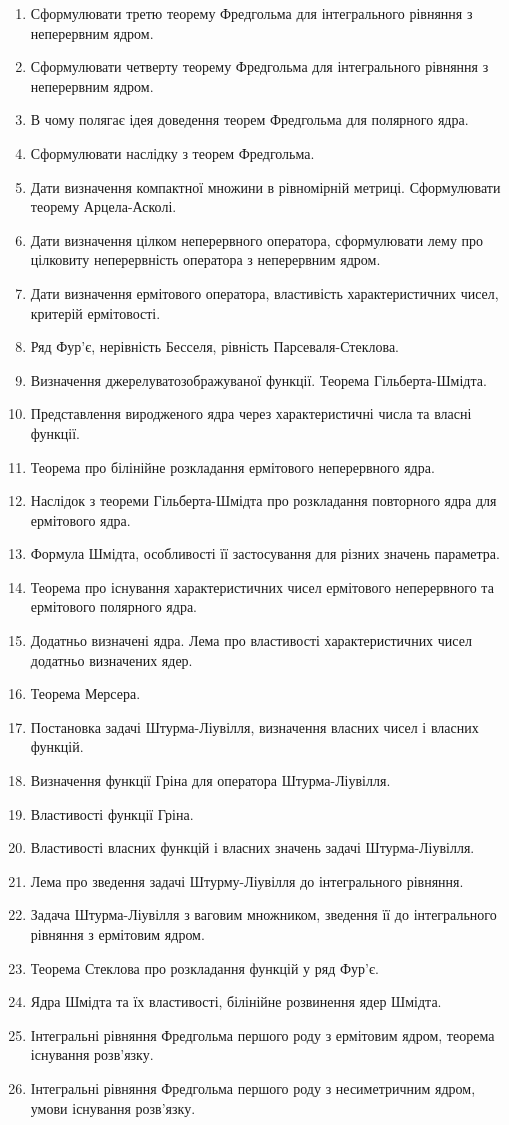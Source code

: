 \begin{enumerate}
	\item Сформулювати третю теорему Фредгольма для інтегрального рівняння з неперервним ядром.
	\item Сформулювати четверту теорему Фредгольма для інтегрального рівняння з неперервним ядром.
	\item В чому полягає ідея доведення теорем Фредгольма для полярного ядра.
	\item Сформулювати наслідку з теорем Фредгольма.
	\item Дати визначення компактної множини в рівномірній метриці. Сформулювати теорему Арцела-Асколі.
	\item Дати визначення цілком неперервного оператора, сформулювати лему про цілковиту неперервність оператора з неперервним ядром.
	\item Дати визначення ермітового оператора, властивість характеристичних чисел, критерій ермітовості.
	\item Ряд Фур'є, нерівність Бесселя, рівність Парсеваля-Стеклова.
	\item Визначення джерелуватозображуваної функції. Теорема Гільберта-Шмідта.
	\item Представлення виродженого ядра через характеристичні числа та власні функції.
	\item Теорема про білінійне розкладання ермітового неперервного ядра.
	\item Наслідок з теореми Гільберта-Шмідта про розкладання повторного ядра для ермітового ядра.
	\item Формула Шмідта, особливості її застосування для різних значень параметра.
	\item Теорема про існування характеристичних чисел ермітового неперервного та ермітового полярного ядра.
	\item Додатньо визначені ядра. Лема про властивості характеристичних чисел додатньо визначених ядер.
	\item Теорема Мерсера.
	\item Постановка задачі Штурма-Ліувілля, визначення власних чисел і власних функцій.
	\item Визначення функції Гріна для оператора Штурма-Ліувілля.
	\item Властивості функції Гріна.
	\item Властивості власних функцій і власних значень задачі Штурма-Ліувілля.
	\item Лема про зведення задачі Штурму-Ліувілля до інтегрального рівняння.
	\item Задача Штурма-Ліувілля з ваговим множником, зведення її до інтегрального рівняння з ермітовим ядром.
	\item Теорема Стеклова про розкладання функцій у ряд Фур'є.
	\item Ядра Шмідта та їх властивості, білінійне розвинення ядер Шмідта.
	\item Інтегральні рівняння Фредгольма першого роду з ермітовим ядром, теорема існування розв'язку.
	\item Інтегральні рівняння Фредгольма першого роду з несиметричним ядром, умови існування розв'язку.
\end{enumerate}

 
